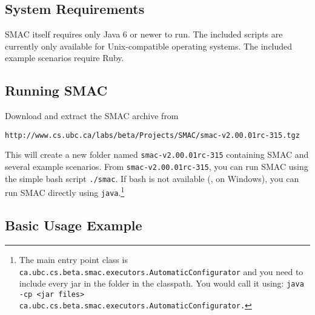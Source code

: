 \documentclass[11pt,letterpaper,twoside]{article}
\begin{document}
\subsection{System Requirements}

SMAC itself requires only Java 6 or newer to run. The included scripts are currently only available for Unix-compatible operating systems. The included example scenarios require Ruby. 

\subsection{Running SMAC}

Download and extract the SMAC archive from
{\small
\begin{verbatim}
http://www.cs.ubc.ca/labs/beta/Projects/SMAC/smac-v2.00.01rc-315.tgz
\end{verbatim}
}
This will create a new folder named \texttt{smac-v2.00.01rc-315} containing SMAC and several example scenarios. 
From \texttt{smac-v2.00.01rc-315}, you can run SMAC using the simple bash script \texttt{./smac}. If bash is not available (\eg{}, on Windows), you can run SMAC directly using \texttt{java}.\footnote{The main entry point class is \texttt{ca.ubc.cs.beta.smac.executors.AutomaticConfigurator} and you need to include every jar in the folder in the classpath. You would call it using: \texttt{java -cp <jar files> {ca.ubc.cs.beta.smac.executors.AutomaticConfigurator}.}}

\subsection{Basic Usage Example}
\end{document}
